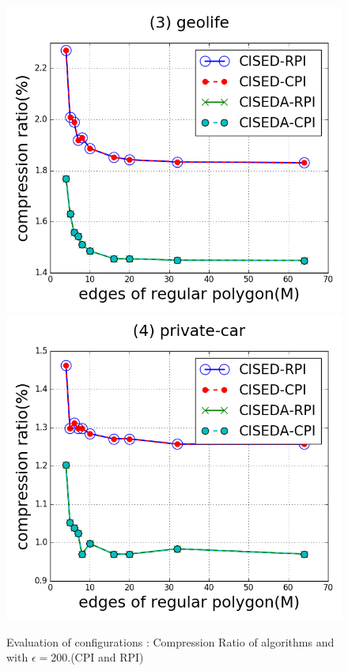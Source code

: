 \begin{figure}[tb!]
\includegraphics[scale = 0.250]{figures/Exp-M-e-200-CR-geolife.png}
\includegraphics[scale = 0.250]{figures/Exp-M-e-200-CR-private.png}
\vspace{-2ex}
\caption{\small Evaluation of configurations : Compression Ratio of algorithms \cist and \cista with $\epsilon = 200$.(CPI and RPI)}
\label{fig:m-cr-e200}
\vspace{-1ex}
\end{figure}


